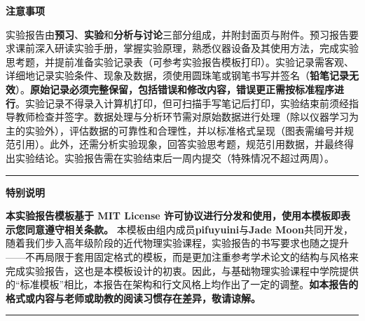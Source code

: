 
\clearpage
\thispagestyle{empty}


\generateExperimentInfo


\noindent\textcolor{fgraygreen}{\textbf{注意事项}}

实验报告由\textbf{预习}、\textbf{实验}和\textbf{分析与讨论}三部分组成，并附封面页与附件。预习报告要求课前深入研读实验手册，掌握实验原理，熟悉仪器设备及其使用方法，完成实验思考题，并提前准备实验记录表（可参考实验报告模板打印）。实验记录需客观、详细地记录实验条件、现象及数据，须使用圆珠笔或钢笔书写并签名（\textbf{铅笔记录无效}）。\textbf{原始记录必须完整保留，包括错误和修改内容，错误更正需按标准程序进行}。实验记录不得录入计算机打印，但可扫描手写笔记后打印，实验结束前须经指导教师检查并签字。数据处理与分析环节需对原始数据进行处理（除以仪器学习为主的实验外），评估数据的可靠性和合理性，并以标准格式呈现（图表需编号并规范引用）。此外，还需分析实验现象，回答实验思考题，规范引用数据，并最终得出实验结论。实验报告需在实验结束后一周内提交（特殊情况不超过两周）。

	
\noindent\textcolor{fgraygreen}{\rule{\textwidth}{1.5pt} }

\noindent\textcolor{fgraygreen}{\textbf{特别说明}}

\textbf{本实验报告模板基于 MIT License 许可协议进行分发和使用，使用本模板即表示您同意遵守相关条款。}
本模板由组内成员\textbf{pifuyuini}与\textbf{Jade Moon}共同开发，随着我们步入高年级阶段的近代物理实验课程，实验报告的书写要求也随之提升——不再局限于套用固定格式的模板，而是更加注重参考学术论文的结构与风格来完成实验报告，这也是本模板设计的初衷。因此，与基础物理实验课程中学院提供的“标准模板”相比，本报告在架构和行文风格上均作出了一定的调整。\textbf{如本报告的格式或内容与老师或助教的阅读习惯存在差异，敬请谅解。}

\noindent\textcolor{fgraygreen}{\rule{\textwidth}{1.5pt} }



	

	

\clearpage
\tableofcontents		